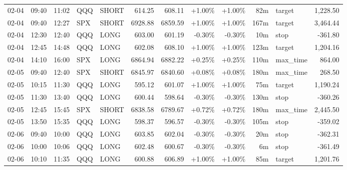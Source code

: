 \documentclass[11pt,a4paper,twoside]{article}
\begin{document}
\begin{center}
\begin{longtable}{>{\color{txtmain}}l l l l l r r r r r >{\color{txtmain}}l r}
02-04 & 09:40 & 11:02 & QQQ & SHORT & 614.25 & 608.11 & \textcolor{wingreen}{+1.00\%} & \textcolor{wingreen}{+1.00\%} & 82m & target & \textcolor{wingreen}{1,228.50} \\
02-04 & 09:40 & 12:27 & SPX & SHORT & 6928.88 & 6859.59 & \textcolor{wingreen}{+1.00\%} & \textcolor{wingreen}{+1.00\%} & 167m & target & \textcolor{wingreen}{3,464.44} \\
02-04 & 12:30 & 12:40 & QQQ & LONG & 603.00 & 601.19 & \textcolor{lossred}{-0.30\%} & \textcolor{lossred}{-0.30\%} & 10m & stop & \textcolor{lossred}{-361.80} \\
02-04 & 12:45 & 14:48 & QQQ & LONG & 602.08 & 608.10 & \textcolor{wingreen}{+1.00\%} & \textcolor{wingreen}{+1.00\%} & 123m & target & \textcolor{wingreen}{1,204.16} \\
02-04 & 14:10 & 16:00 & SPX & LONG & 6864.94 & 6882.22 & \textcolor{wingreen}{+0.25\%} & \textcolor{wingreen}{+0.25\%} & 110m & max\_time & \textcolor{wingreen}{864.00} \\
02-05 & 09:40 & 12:40 & SPX & SHORT & 6845.97 & 6840.60 & \textcolor{wingreen}{+0.08\%} & \textcolor{wingreen}{+0.08\%} & 180m & max\_time & \textcolor{wingreen}{268.50} \\
02-05 & 10:15 & 11:30 & QQQ & LONG & 595.12 & 601.07 & \textcolor{wingreen}{+1.00\%} & \textcolor{wingreen}{+1.00\%} & 75m & target & \textcolor{wingreen}{1,190.24} \\
02-05 & 11:30 & 13:40 & QQQ & LONG & 600.44 & 598.64 & \textcolor{lossred}{-0.30\%} & \textcolor{lossred}{-0.30\%} & 130m & stop & \textcolor{lossred}{-360.26} \\
02-05 & 12:45 & 15:45 & SPX & SHORT & 6838.58 & 6789.67 & \textcolor{wingreen}{+0.72\%} & \textcolor{wingreen}{+0.72\%} & 180m & max\_time & \textcolor{wingreen}{2,445.50} \\
02-05 & 13:50 & 15:35 & QQQ & LONG & 598.37 & 596.57 & \textcolor{lossred}{-0.30\%} & \textcolor{lossred}{-0.30\%} & 105m & stop & \textcolor{lossred}{-359.02} \\
02-06 & 09:40 & 10:00 & QQQ & LONG & 603.85 & 602.04 & \textcolor{lossred}{-0.30\%} & \textcolor{lossred}{-0.30\%} & 20m & stop & \textcolor{lossred}{-362.31} \\
02-06 & 10:00 & 10:06 & QQQ & LONG & 602.48 & 600.67 & \textcolor{lossred}{-0.30\%} & \textcolor{lossred}{-0.30\%} & 6m & stop & \textcolor{lossred}{-361.49} \\
02-06 & 10:10 & 11:35 & QQQ & LONG & 600.88 & 606.89 & \textcolor{wingreen}{+1.00\%} & \textcolor{wingreen}{+1.00\%} & 85m & target & \textcolor{wingreen}{1,201.76} \\

\end{longtable}
\end{center}
\end{document}
